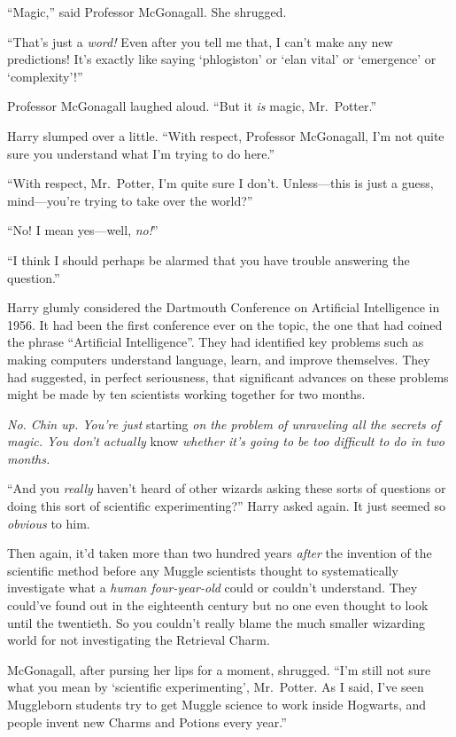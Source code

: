 “Magic,” said Professor McGonagall. She shrugged.

“That’s just a \emph{word!} Even after you tell me that, I can’t make any new predictions! It’s exactly like saying ‘phlogiston’ or ‘elan vital’ or ‘emergence’ or ‘complexity’!”

Professor McGonagall laughed aloud. “But it \emph{is} magic, Mr.~Potter.”

Harry slumped over a little. “With respect, Professor McGonagall, I’m not quite sure you understand what I’m trying to do here.”

“With respect, Mr.~Potter, I’m quite sure I don’t. Unless—this is just a guess, mind—you’re trying to take over the world?”

“No! I mean yes—well, \emph{no!}”

“I think I should perhaps be alarmed that you have trouble answering the question.”

Harry glumly considered the Dartmouth Conference on Artificial Intelligence in 1956. It had been the first conference ever on the topic, the one that had coined the phrase “Artificial Intelligence”. They had identified key problems such as making computers understand language, learn, and improve themselves. They had suggested, in perfect seriousness, that significant advances on these problems might be made by ten scientists working together for two months.

\emph{No. Chin up. You’re just} starting \emph{on the problem of unraveling all the secrets of magic. You don’t actually} know \emph{whether it’s going to be too difficult to do in two months.}

“And you \emph{really} haven’t heard of other wizards asking these sorts of questions or doing this sort of scientific experimenting?” Harry asked again. It just seemed so \emph{obvious} to him.

Then again, it’d taken more than two hundred years \emph{after} the invention of the scientific method before any Muggle scientists thought to systematically investigate what a \emph{human four-year-old} could or couldn’t understand. They could’ve found out in the eighteenth century but no one even thought to look until the twentieth. So you couldn’t really blame the much smaller wizarding world for not investigating the Retrieval Charm.

McGonagall, after pursing her lips for a moment, shrugged. “I’m still not sure what you mean by ‘scientific experimenting’, Mr.~Potter. As I said, I’ve seen Muggleborn students try to get Muggle science to work inside Hogwarts, and people invent new Charms and Potions every year.”

